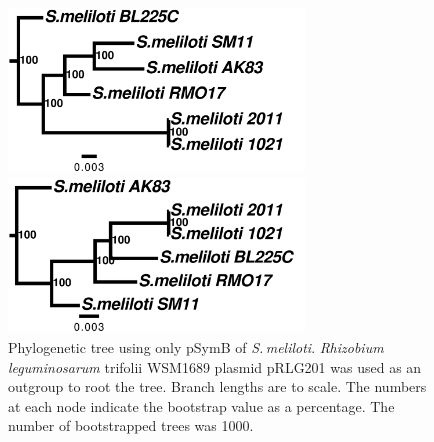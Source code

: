 \documentclass[11pt]{article}
\newcommand{\smel}{\textit{S.\,meliloti}\xspace}
\newcommand{\rleg}{\textit{Rhizobium leguminosarum}\xspace}
\begin{document}
\begin{figure}
	\begin{center}
		\includegraphics[width=0.7\textwidth]{./figs/pSymA_chrom_figtree_raw_29Aug20.pdf}
		\caption{\label{fig:sinoPAtree} Phylogenetic tree using only pSymA of \smel. \rleg trifolii WSM1689 plasmid pRLG202 was used as an outgroup to root the tree. Branch lengths are to scale. The numbers at each node indicate the bootstrap value as a percentage. The number of bootstrapped trees was 1000.}
	\end{center}
	\vspace*{\floatsep}%
	\begin{center}
		
		\includegraphics[width=0.7\textwidth]{./figs/pSymB_chrom_figtree_raw_29Aug20.pdf}
		\caption{\label{fig:sinoPBtree} Phylogenetic tree using only pSymB of \smel. \rleg trifolii WSM1689 plasmid pRLG201 was used as an outgroup to root the tree. Branch lengths are to scale. The numbers at each node indicate the bootstrap value as a percentage. The number of bootstrapped trees was 1000.}
	\end{center}
\end{figure}
\end{document}
